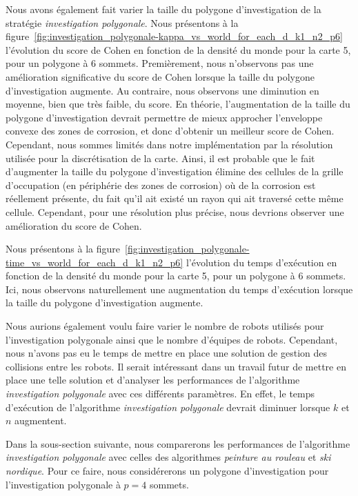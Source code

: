 \documentclass[francais,RandD]{rapportPFE}
\begin{document}
			Nous avons également fait varier la taille du polygone d'investigation de la stratégie \textit{investigation polygonale}.
			Nous présentons à la figure~\ref{fig:investigation_polygonale-kappa_vs_world_for_each_d_k1_n2_p6} l'évolution du score de Cohen en fonction de la densité du monde pour la carte 5, pour un polygone à 6 sommets.
			Premièrement, nous n'observons pas une amélioration significative du score de Cohen lorsque la taille du polygone d'investigation augmente.
			Au contraire, nous observons une diminution en moyenne, bien que très faible, du score.
			En théorie, l'augmentation de la taille du polygone d'investigation devrait permettre de mieux approcher l'enveloppe convexe des zones de corrosion, et donc d'obtenir un meilleur score de Cohen.
			Cependant, nous sommes limités dans notre implémentation par la résolution utilisée pour la discrétisation de la carte.
			Ainsi, il est probable que le fait d'augmenter la taille du polygone d'investigation élimine des cellules de la grille d'occupation (en périphérie des zones de corrosion) où de la corrosion est réellement présente, du fait qu'il ait existé un rayon qui ait traversé cette même cellule.
			Cependant, pour une résolution plus précise, nous devrions observer une amélioration du score de Cohen.

			Nous présentons à la figure~\ref{fig:investigation_polygonale-time_vs_world_for_each_d_k1_n2_p6} l'évolution du temps d'exécution en fonction de la densité du monde pour la carte 5, pour un polygone à 6 sommets.
			Ici, nous observons naturellement une augmentation du temps d'exécution lorsque la taille du polygone d'investigation augmente.

			Nous aurions également voulu faire varier le nombre de robots utilisés pour l'investigation polygonale ainsi que le nombre d'équipes de robots.
			Cependant, nous n'avons pas eu le temps de mettre en place une solution de gestion des collisions entre les robots.
			Il serait intéressant dans un travail futur de mettre en place une telle solution et d'analyser les performances de l'algorithme \textit{investigation polygonale} avec ces différents paramètres.
			En effet, le temps d'exécution de l'algorithme \textit{investigation polygonale} devrait diminuer lorsque $k$ et $n$ augmentent.

			Dans la sous-section suivante, nous comparerons les performances de l'algorithme \textit{investigation polygonale} avec celles des algorithmes \textit{peinture au rouleau} et \textit{ski nordique}.
			Pour ce faire, nous considérerons un polygone d'investigation pour l'investigation polygonale à $p = 4$ sommets.
\end{document}
